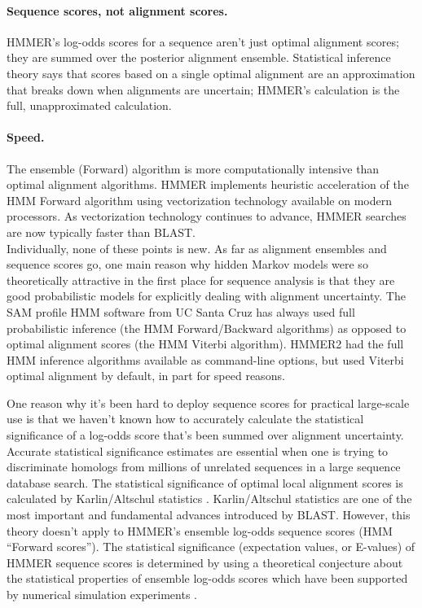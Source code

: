 \paragraph{Sequence scores, not alignment scores.} HMMER's
  log-odds scores for a sequence aren't just optimal alignment scores;
  they are summed over the posterior alignment ensemble. Statistical
  inference theory says that scores based on a single optimal
  alignment are an approximation that breaks down when alignments are
  uncertain; HMMER's calculation is the full, unapproximated
  calculation.
 
\paragraph{Speed.} The ensemble (Forward) algorithm is more
  computationally intensive than optimal alignment algorithms.  HMMER
  implements heuristic acceleration of the HMM Forward algorithm using
  vectorization technology available on modern processors. As
  vectorization technology continues to advance, HMMER searches are
  now typically faster than BLAST.\\


Individually, none of these points is new. As far as alignment
ensembles and sequence scores go, one main reason why hidden Markov
models were so theoretically attractive in the first place for
sequence analysis is that they are good probabilistic models for
explicitly dealing with alignment uncertainty. The SAM profile HMM
software from UC Santa Cruz has always used full probabilistic
inference (the HMM Forward/Backward algorithms) as opposed to optimal
alignment scores (the HMM Viterbi algorithm). HMMER2 had the full HMM
inference algorithms available as command-line options, but used
Viterbi optimal alignment by default, in part for speed
reasons.

One reason why it's been hard to deploy sequence scores for practical
large-scale use is that we haven't known how to accurately calculate
the statistical significance of a log-odds score that's been summed
over alignment uncertainty. Accurate statistical significance
estimates are essential when one is trying to discriminate homologs
from millions of unrelated sequences in a large sequence database
search. The statistical significance of optimal local alignment scores
is calculated by Karlin/Altschul statistics
\citep{Karlin90,KarlinAltschul93}. Karlin/Altschul statistics are one
of the most important and fundamental advances introduced by BLAST.
However, this theory doesn't apply to HMMER's ensemble log-odds
sequence scores (HMM ``Forward scores''). The statistical significance
(expectation values, or E-values) of HMMER sequence scores is
determined by using a theoretical conjecture about the statistical
properties of ensemble log-odds scores which have been supported by
numerical simulation experiments \citep{Eddy08}.

